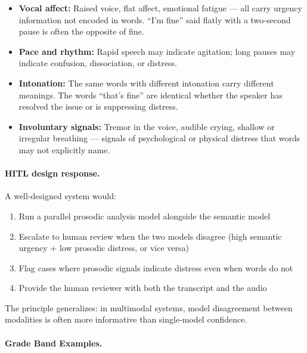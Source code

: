\begin{itemize}
    \item \textbf{Vocal affect:} Raised voice, flat affect, emotional fatigue --- all carry urgency information not encoded in words. ``I'm fine'' said flatly with a two-second pause is often the opposite of fine.
    \item \textbf{Pace and rhythm:} Rapid speech may indicate agitation; long pauses may indicate confusion, dissociation, or distress.
    \item \textbf{Intonation:} The same words with different intonation carry different meanings. The words ``that's fine'' are identical whether the speaker has resolved the issue or is suppressing distress.
    \item \textbf{Involuntary signals:} Tremor in the voice, audible crying, shallow or irregular breathing --- signals of psychological or physical distress that words may not explicitly name.
\end{itemize}

\paragraph{HITL design response.}

A well-designed system would:
\begin{enumerate}
    \item Run a parallel prosodic analysis model alongside the semantic model
    \item Escalate to human review when the two models disagree (high semantic urgency + low prosodic distress, or vice versa)
    \item Flag cases where prosodic signals indicate distress even when words do not
    \item Provide the human reviewer with both the transcript and the audio
\end{enumerate}

The principle generalizes: in multimodal systems, model disagreement between modalities is often more informative than single-model confidence.

\paragraph{Grade Band Examples.}

